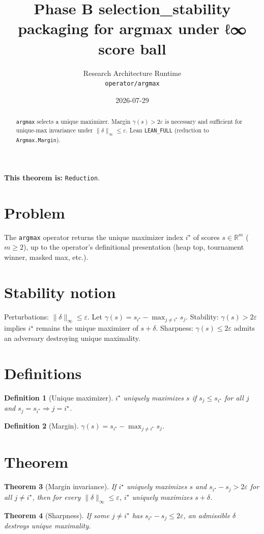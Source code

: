 \documentclass[11pt]{article}
\title{Phase B selection_stability packaging for argmax under ℓ∞ score ball}
\author{Research Architecture Runtime \\ \texttt{operator/argmax}}
\date{2026-07-29}
\newtheorem{theorem}{Theorem}
\newtheorem{definition}[theorem]{Definition}
\begin{document}
\maketitle

\begin{abstract}
\texttt{argmax} selects a unique maximizer. Margin $\gamma(s)>2\varepsilon$ is necessary and sufficient for unique-max invariance under $\|\delta\|_\infty\le\varepsilon$. Lean \texttt{LEAN\_FULL} (reduction to \texttt{Argmax.Margin}).
\end{abstract}

\noindent\textbf{This theorem is:} \texttt{Reduction}.

\section{Problem}
The \texttt{argmax} operator returns the unique maximizer index $i^\star$ of scores $s\in\mathbb{R}^m$ ($m\ge 2$), up to the operator's definitional presentation (heap top, tournament winner, masked max, etc.).

\section{Stability notion}
Perturbations: $\|\delta\|_\infty\le\varepsilon$. Let $\gamma(s)=s_{i^\star}-\max_{j\neq i^\star}s_j$. Stability: $\gamma(s)>2\varepsilon$ implies $i^\star$ remains the unique maximizer of $s+\delta$. Sharpness: $\gamma(s)\le 2\varepsilon$ admits an adversary destroying unique maximality.

\section{Definitions}
\begin{definition}[Unique maximizer]
$i^\star$ uniquely maximizes $s$ if $s_j\le s_{i^\star}$ for all $j$ and $s_j=s_{i^\star}\Rightarrow j=i^\star$.
\end{definition}
\begin{definition}[Margin]
$\gamma(s)=s_{i^\star}-\max_{j\neq i^\star}s_j$.\end{definition}

\section{Theorem}
\begin{theorem}[Margin invariance]\label{thm:inv}
If $i^\star$ uniquely maximizes $s$ and $s_{i^\star}-s_j>2\varepsilon$ for all $j\neq i^\star$, then for every $\|\delta\|_\infty\le\varepsilon$, $i^\star$ uniquely maximizes $s+\delta$.
\end{theorem}
\begin{theorem}[Sharpness]\label{thm:sharp}
If some $j\neq i^\star$ has $s_{i^\star}-s_j\le 2\varepsilon$, an admissible $\delta$ destroys unique maximality.
\end{theorem}
\end{document}
